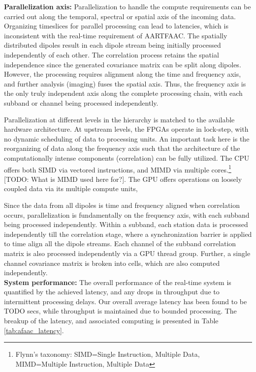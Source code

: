 \documentclass{ws-jai}
\begin{document}
\noindent \textbf  {Parallelization axis:}  Parallelization to handle  the compute
requirements can be carried out along  the temporal, spectral or spatial axis of
the incoming  data.  Organizing timeslices  for parallel processing can  lead to
latencies, which is inconsistent with the real-time requirement of AARTFAAC. The
spatially  distributed dipoles  result  in each  dipole  stream being  initially
processed  independently of  each other.   The correlation  process retains  the
spatial independence  since the generated  covariance matrix can be  split along
dipoles.   However,  the  processing  requires  alignment  along  the  time  and
frequency axis,  and further analysis  (imaging) fuses the spatial  axis.  Thus,
the  frequency axis  is  the  only truly  independent  axis  along the  complete
processing chain, with each subband or channel being processed independently.

Parallelization at different levels in the hierarchy is matched to the available
hardware architecture.  At upstream levels, the FPGAs operate in lock-step, with
no dynamic scheduling of data to processing units. An important task here is the
reorganizing of data along the frequency  axis such that the architecture of the
computationally intense components (correlation) can  be fully utilized. The CPU
offers   both  SIMD   via   vectored  instructions,   and   MIMD  via   multiple
cores.\footnote  {Flynn's  taxonomy:  SIMD=Single  Instruction,  Multiple  Data,
  MIMD=Multiple  Instruction,  Multiple Data}  [TODO:  What  is MIMD  used  here
  for?]. The  GPU offers  operations on  loosely coupled  data via  its multiple
compute units,

Since the data  from all dipoles is time and  frequency aligned when correlation
occurs,  parallelization  is fundamentally  on  the  frequency axis,  with  each
subband being processed  independently.  Within a subband, each  station data is
processed  independently till  the  correlation stage,  where a  synchronization
barrier is applied  to time align all  the dipole streams.  Each  channel of the
subband  correlation matrix  is also  processed independently  via a  GPU thread
group.  Further, a single channel covariance  matrix is broken into cells, which
are also computed independently.\\


\noindent \textbf {System performance:} The overall performance of the real-time
system is quantified by the achieved latency, and any drops in throughput due to
intermittent processing delays. Our overall average latency has been found to be
TODO secs, while throughput is maintained due to bounded processing. The breakup
of   the   latency,   and   associated   computing   is   presented   in   Table
\ref{tab:afaac_latency}.\\
\end{document}
